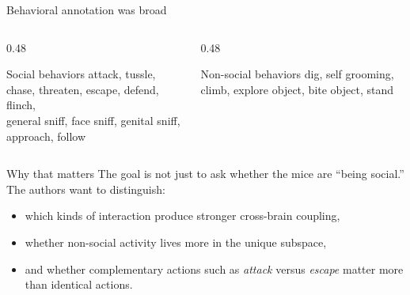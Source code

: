 \documentclass[aspectratio=169,11pt]{beamer}
\begin{document}
\begin{frame}{Behavioral annotation was broad}
\begin{columns}[T]
  \begin{column}{0.48\textwidth}
    \begin{block}{Social behaviors}
    \scriptsize
    attack, tussle, chase, threaten, escape, defend, flinch,\\
    general sniff, face sniff, genital sniff, approach, follow
    \end{block}
  \end{column}
  \begin{column}{0.48\textwidth}
    \begin{block}{Non-social behaviors}
    \scriptsize
    dig, self grooming, climb, explore object, bite object, stand
    \end{block}
  \end{column}
\end{columns}
\vspace{0.6em}
\begin{block}{Why that matters}
The goal is not just to ask whether the mice are ``being social.'' The authors want to distinguish:
\begin{itemize}
  \item which kinds of interaction produce stronger cross-brain coupling,
  \item whether non-social activity lives more in the unique subspace,
  \item and whether complementary actions such as \textit{attack} versus \textit{escape} matter more than identical actions.
\end{itemize}
\end{block}
\end{frame}
\end{document}
